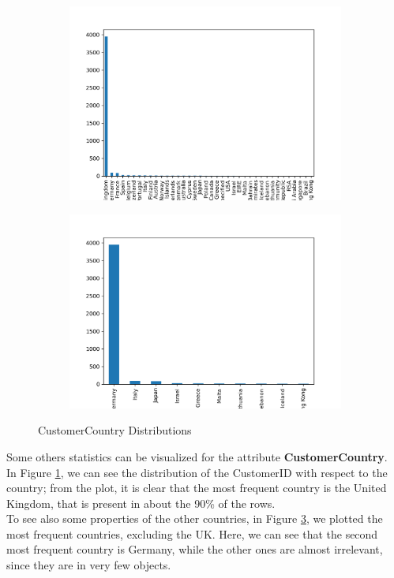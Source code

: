 \begin{figure}[!h]
\begin{subfigure}{.5\textwidth}
\centering
\includegraphics[width=\textwidth]{img/country_bar.png}
\caption{}
\label{fig:country_bar}
\end{subfigure}
\begin{subfigure}{.5\textwidth}
\centering
\includegraphics[width=\textwidth]{img/part_country_bar.png}
\caption{}
\label{fig:part_country_bar}
\end{subfigure}
\caption{CustomerCountry Distributions}
\end{figure}

Some others statistics can be visualized for the attribute \textbf{CustomerCountry}.\\
In Figure \ref{fig:country_bar}, we can see the distribution of the CustomerID with respect to the country; from the plot, it is clear that the most frequent country is the United Kingdom, that is present in about the 90\% of the rows.\\
To see also some properties of the other countries, in Figure \ref{fig:part_country_bar}, we plotted the most frequent countries, excluding the UK. Here, we can see that the second most frequent country is Germany, while the other ones are almost irrelevant, since they are in very few objects.


